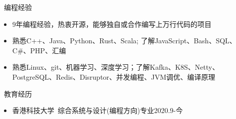 \documentclass[UTF8]{resume}
\begin{document}
  
\begin{rSection}{\faCogs~编程经验}
    \begin{itemize}
        \itemsep -0.5em
        \item 9年编程经验，热衷开源，能够独自或合作编写上万行代码的项目
        \item 熟悉C++、Java、Python、Rust、Scala; 了解JavaScript、Bash、SQL、C\#、PHP、汇编
        \item 熟悉Linux、git、机器学习、深度学习；了解Kafka、K8S、Netty、PostgreSQL、Redis、Disruptor、并发编程、JVM调优、编译原理
    \end{itemize}
    
\end{rSection}
\begin{rSection}{\faGraduationCap~教育经历}
    \begin{itemize}
        \item 香港科技大学~综合系统与设计(编程方向)专业\hfill 2020.9-今
    \end{itemize}
\end{rSection}
\end{document}
